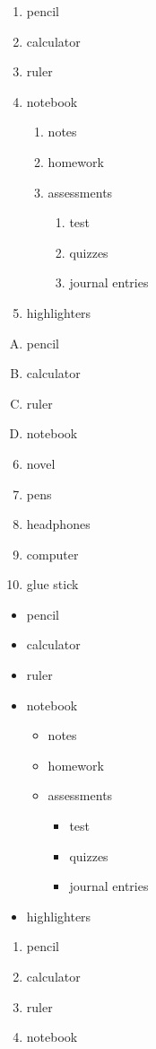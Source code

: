 \documentclass[11pt]{article}
\begin{document}
\begin{enumerate}
\item pencil
\item calculator
\item ruler
\item notebook
    \begin{enumerate}
    \item notes
    \item homework
    \item assessments
        \begin{enumerate}
            \item test
            \item quizzes
            \item journal entries
        \end{enumerate}
    \end{enumerate}
\item highlighters
\end{enumerate}

\vspace{1cm}

\begin{enumerate}[A.]
\item pencil
\item calculator
\item ruler
\item notebook
\end{enumerate}

\vspace{1cm}

\begin{enumerate} \setcounter{enumi}{5}
\item novel
\item pens
\item headphones
\item computer
\item glue stick
\end{enumerate}

\pagebreak

\begin{itemize}
\item pencil
\item calculator
\item ruler
\item notebook
    \begin{itemize}
    \item notes
    \item homework
    \item assessments
        \begin{itemize}
            \item test
            \item quizzes
            \item journal entries
        \end{itemize}
    \end{itemize}
\item highlighters
\end{itemize}

\vspace{1cm}

\begin{enumerate}[]
\item pencil
\item calculator
\item ruler
\item notebook
\end{enumerate}
\end{document}
